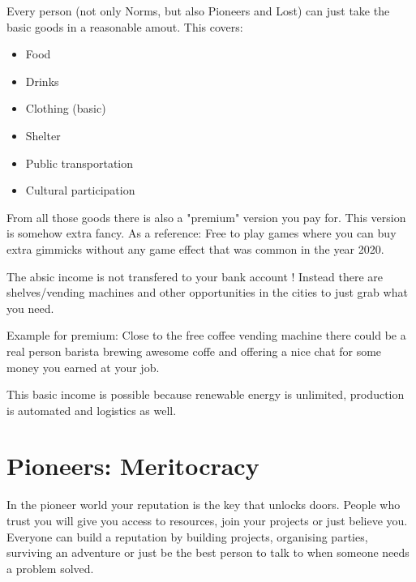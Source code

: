 Every person (not only Norms, but also Pioneers and Lost) can just take the basic goods in a reasonable amout. This covers:

\begin{itemize}
    \item Food
    \item Drinks
    \item Clothing (basic)
    \item Shelter
    \item Public transportation
    \item Cultural participation
\end{itemize}

From all those goods there is also a "premium" version you pay for. This version is somehow extra fancy. As a reference: Free to play games where you can buy extra gimmicks without any game effect that was common in the year 2020.

The absic income is not transfered to your bank account ! Instead there are shelves/vending machines and other opportunities in the cities to just grab what you need.

Example for premium: Close to the free coffee vending machine there could be a real person barista brewing awesome coffe and offering a nice chat for some money you earned at your job.

This basic income is possible because renewable energy is unlimited, production is automated and logistics as well.


\section{Pioneers: Meritocracy}
\label{sec:meritocracy}

In the pioneer world your reputation is the key that unlocks doors. People who trust you will give you access to resources, join your projects or just believe you.
Everyone can build a reputation by building projects, organising parties, surviving an adventure or just be the best person to talk to when someone needs a problem solved.
